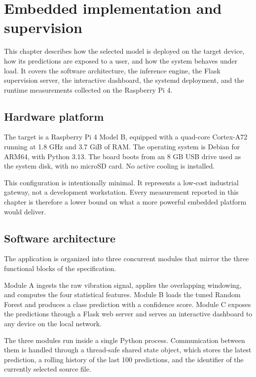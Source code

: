 \chapter{Embedded implementation and supervision}
\label{ch:embedded}

This chapter describes how the selected model is deployed on the target device, how its predictions are exposed to a user, and how the system behaves under load. It covers the software architecture, the inference engine, the Flask supervision server, the interactive dashboard, the systemd deployment, and the runtime measurements collected on the Raspberry Pi 4.

\section{Hardware platform}

The target is a Raspberry Pi 4 Model B, equipped with a quad-core Cortex-A72 running at 1.8 GHz and 3.7 GiB of RAM. The operating system is Debian for ARM64, with Python 3.13. The board boots from an 8 GB USB drive used as the system disk, with no microSD card. No active cooling is installed.

This configuration is intentionally minimal. It represents a low-cost industrial gateway, not a development workstation. Every measurement reported in this chapter is therefore a lower bound on what a more powerful embedded platform would deliver.

\section{Software architecture}

The application is organized into three concurrent modules that mirror the three functional blocks of the specification.

Module A ingests the raw vibration signal, applies the overlapping windowing, and computes the four statistical features. Module B loads the tuned Random Forest and produces a class prediction with a confidence score. Module C exposes the predictions through a Flask web server and serves an interactive dashboard to any device on the local network.

The three modules run inside a single Python process. Communication between them is handled through a thread-safe shared state object, which stores the latest prediction, a rolling history of the last 100 predictions, and the identifier of the currently selected source file.

